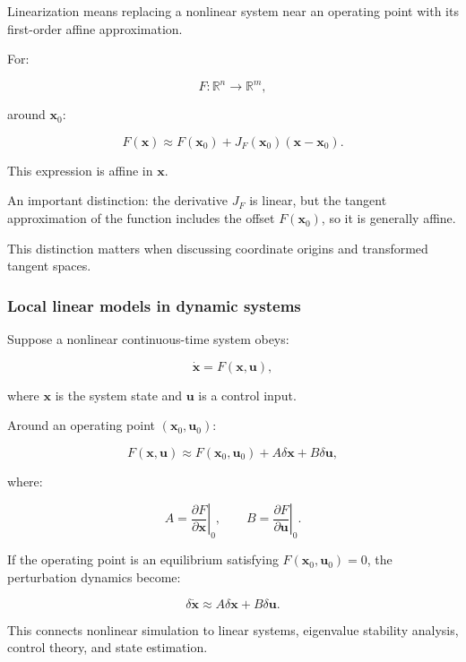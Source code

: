 \hypertarget{02-foundations-ii-ch021-first-order-linearization}{}

Linearization means replacing a nonlinear system near an operating point with its first-order affine approximation.

For:

\[
F:\mathbb R^n\rightarrow\mathbb R^m,
\]

around \(\mathbf x_0\):

\[
\boxed{ F(\mathbf x)\approx F(\mathbf x_0)+ J_F(\mathbf x_0)(\mathbf x-\mathbf x_0) }.
\]

This expression is affine in \(\mathbf x\).

An important distinction: the derivative \(J_F\) is linear, but the tangent approximation of the function includes the offset \(F(\mathbf x_0)\), so it is generally affine.

This distinction matters when discussing coordinate origins and transformed tangent spaces.

\subsubsection{Local linear models in dynamic systems}\label{02-foundations-ii-ch021-local-linear-models-in-dynamic-systems}

\hypertarget{02-foundations-ii-ch021-local-linear-models-in-dynamic-systems}{}

Suppose a nonlinear continuous-time system obeys:

\[
\dot{\mathbf x}=F(\mathbf x,\mathbf u),
\]

where \(\mathbf x\) is the system state and \(\mathbf u\) is a control input.

Around an operating point \((\mathbf x_0,\mathbf u_0)\):

\[
F(\mathbf x,\mathbf u) \approx F(\mathbf x_0,\mathbf u_0) +A\delta\mathbf x+B\delta\mathbf u,
\]

where:

\[
A=\left.\frac{\partial F}{\partial\mathbf x}\right|_0, \qquad B=\left.\frac{\partial F}{\partial\mathbf u}\right|_0.
\]

If the operating point is an equilibrium satisfying \(F(\mathbf x_0,\mathbf u_0)=0\), the perturbation dynamics become:

\[
\delta\dot{\mathbf x}\approx A\delta\mathbf x+B\delta\mathbf u.
\]

This connects nonlinear simulation to linear systems, eigenvalue stability analysis, control theory, and state estimation.

